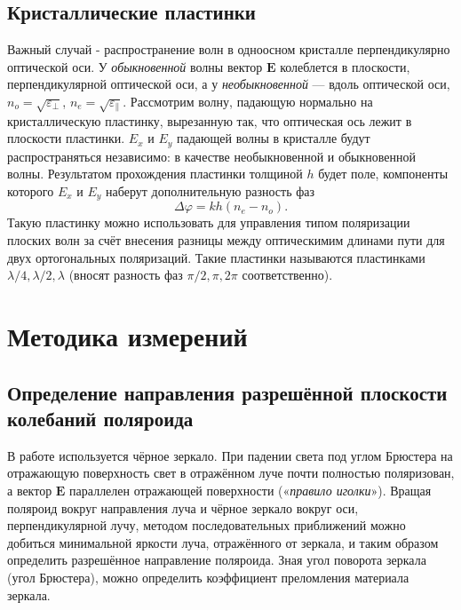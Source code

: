 
\subsection*{Кристаллические пластинки}
Важный случай - распространение волн в одноосном кристалле перпендикулярно оптической оси. У \textit{обыкновенной} волны вектор $\bm{E}$ колеблется в плоскости,
перпендикулярной оптической оси, а у \textit{необыкновенной} — вдоль оптической оси, $n_{o} = \sqrt{\varepsilon_{\perp}}$, $n_{e} = \sqrt{\varepsilon_{\parallel}}$.
\n\n
Рассмотрим волну, падающую нормально на
кристаллическую пластинку, вырезанную так, что оптическая ось лежит в плоскости пластинки. $E_x$ и $E_y$ падающей волны в кристалле будут распространяться независимо: в качестве необыкновенной и обыкновенной волны. Результатом прохождения пластинки
толщиной $h$ будет поле, компоненты которого $E_x$ и $E_y$ наберут дополнительную разность фаз
\[\Delta \varphi = kh(n_e - n_o).\]
\n
Такую пластинку можно использовать для управления типом поляризации плоских волн за счёт  внесения разницы между оптическимим длинами пути для двух ортогональных поляризаций. Такие пластинки называются пластинками $\lambda / 4, \lambda / 2, \lambda$ (вносят разность фаз $\pi / 2, \pi, 2\pi$ соответственно).

\section*{Методика измерений}
\subsection*{Определение направления разрешённой плоскости колебаний
поляроида}
В работе используется чёрное зеркало. При падении света под углом Брюстера на отражающую поверхность свет в отражённом луче почти полностью поляризован, а вектор $\bm{E}$
параллелен отражающей поверхности («\textit{правило иголки}»).
\n\n
Вращая поляроид вокруг направления луча и чёрное зеркало вокруг
оси, перпендикулярной лучу, методом последовательных приближений
можно добиться минимальной яркости луча, отражённого от зеркала,
и таким образом определить разрешённое направление поляроида.
\n\n
Зная угол поворота зеркала (угол Брюстера), можно определить  коэффициент преломления материала зеркала.

